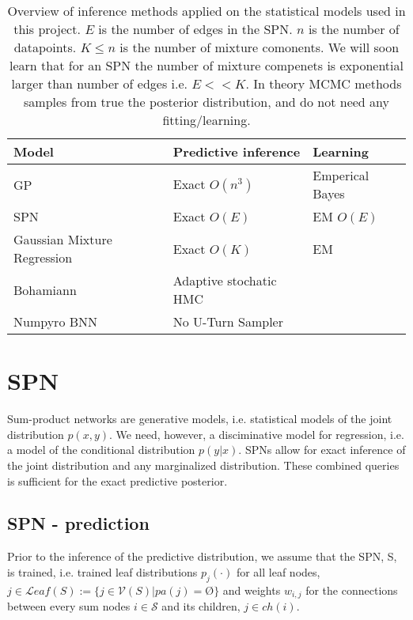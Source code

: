\begin{table}[H]
    \centering
    \begin{tabular}{l|l|l}
    \textbf{Model} & \textbf{Predictive inference} &   \textbf{Learning} \\ \hline
    GP          & Exact $O(n^3)$  & Emperical Bayes\\
    SPN             & Exact $O(E)$ &  EM $O(E)$\\
    Gaussian Mixture Regression & Exact $O(K)$ & EM  \\
    Bohamiann                             & Adaptive stochatic HMC & \\
    Numpyro BNN                           & No U-Turn Sampler & 
    \end{tabular}
    \caption{Overview of inference methods applied on the statistical models 
            used in this project. $E$ is the number of edges in the SPN. $n$ is the number of datapoints. 
            $K \leq n$ is the number of mixture comonents. We will soon learn that for an
            SPN the number of mixture compenets is exponential larger than number of edges
            i.e. $E << K$. In theory MCMC methods samples 
            from true the posterior distribution, and do not need any fitting/learning. 
            }
\end{table}

\section{SPN}
Sum-product networks are generative models, i.e. statistical models of the joint distribution $p(x,y)$. 
We need, however, a disciminative model for regression, i.e. 
a model of the conditional distribution $p(y|x)$. 
SPNs allow for exact inference of the joint distribution 
and any marginalized distribution. These combined queries is sufficient for the
exact predictive posterior. 

\subsection{SPN - prediction}
Prior to the inference of the predictive distribution, we assume that the SPN, S, is trained, i.e.
trained leaf distributions $p_j(\cdot)$ for all leaf nodes, 
$j \in \mathcal{L}eaf(S):=\{j \in \mathcal{V}(S) |pa(j) = \text{Ø}\}$ and
weights $w_{i,j}$ for the connections between every sum nodes
$i \in \mathcal{S}$ and its children, $j \in ch(i)$.  

